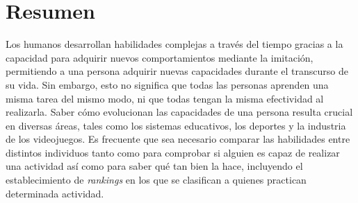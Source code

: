 \documentclass[11pt,twoside,spanish]{report} %
\begin{document}
\chapter*{Resumen}
\pagestyle{empty}
\thispagestyle{empty}


Los humanos desarrollan habilidades complejas a trav\'es del tiempo gracias a la capacidad para adquirir nuevos comportamientos mediante la imitaci\'on, permitiendo a una persona adquirir nuevas capacidades durante el transcurso de su vida. 
Sin embargo, esto no significa que todas las personas aprenden una misma tarea del mismo modo, ni que todas tengan la misma efectividad al realizarla.
%
Saber c\'omo evolucionan las capacidades de una persona resulta crucial en diversas \'areas, tales como los sistemas educativos, los deportes y la industria de los videojuegos.
Es frecuente que sea necesario comparar las habilidades entre distintos individuos tanto como para comprobar si alguien es capaz de realizar una actividad as\'i como para saber qu\'e tan bien la hace, incluyendo el establecimiento de \emph{rankings} en los que se clasifican a quienes practican determinada actividad.

% 
% 
\end{document}
